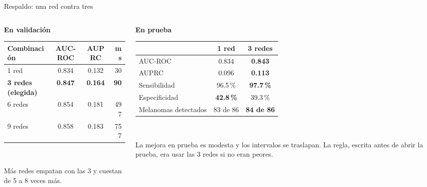 \documentclass[aspectratio=169,10pt]{beamer}
\begin{document}
\begin{frame}{Respaldo: una red contra tres}
  \begin{columns}[T]
    \begin{column}{0.48\textwidth}
      \centering
      \textbf{En validación}\\[0.4em]
      \small\setlength{\tabcolsep}{4pt}
      \begin{tabular}{lccr}
        \toprule
        \textbf{Combinación} & \textbf{AUC-ROC} & \textbf{AUPRC} & \textbf{ms} \\
        \midrule
        1 red & 0.834 & 0.132 & 30 \\
        \textbf{3 redes (elegida)} & \textbf{0.847} & \textbf{0.164} & \textbf{90} \\
        6 redes & 0.854 & 0.181 & 497 \\
        9 redes & 0.858 & 0.183 & 757 \\
        \bottomrule
      \end{tabular}\\[0.5em]
      \raggedright\small
      Más redes empatan con las 3 y cuestan de 5 a 8 veces más.
    \end{column}
    \begin{column}{0.48\textwidth}
      \centering
      \textbf{En prueba}\\[0.4em]
      \small\setlength{\tabcolsep}{4pt}
      \begin{tabular}{lcc}
        \toprule
        & \textbf{1 red} & \textbf{3 redes} \\
        \midrule
        AUC-ROC & 0.834 & \textbf{0.843} \\
        AUPRC & 0.096 & \textbf{0.113} \\
        Sensibilidad & 96.5\,\% & \textbf{97.7\,\%} \\
        Especificidad & \textbf{42.8\,\%} & 39.3\,\% \\
        Melanomas detectados & 83 de 86 & \textbf{84 de 86} \\
        \bottomrule
      \end{tabular}\\[0.5em]
      \raggedright\small
      La mejora en prueba es modesta y los intervalos se traslapan. La regla, escrita antes de abrir la prueba, era usar las 3 redes si no eran peores.
    \end{column}
  \end{columns}
\end{frame}
\end{document}
